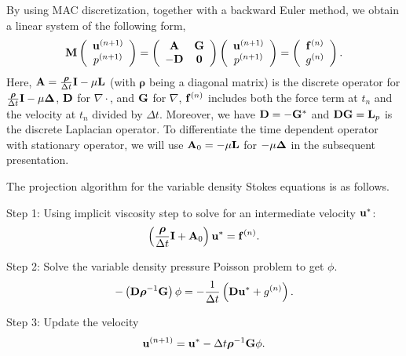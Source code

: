 \documentclass[9pt]{article}
\newcommand{\V}[1]{\boldsymbol{#1}}
\begin{document}
By using MAC discretization, together with a backward Euler method, we obtain a linear system of the following form,
\begin{equation}\label{Saddle_operator}
{\bf M} \left(\begin{array}{c}
{\bf u}^{(n+1)} \\
p^{(n+1)}
\end{array}\right)=
\left(\begin{array}{cc}
{\bf A} & {\bf G} \\
-{\bf D} & {\bf 0}
\end{array}\right)
\left(\begin{array}{c}
{\bf u}^{(n+1)} \\
p^{(n+1)}
\end{array}\right)=
\left(\begin{array}{c}
 {\bf f}^{(n)} \\
 g^{(n)}
\end{array}\right).
\end{equation}
Here, ${\bf A}=\frac{\V{\rho}}{\Delta t}{\bf I} - \mu {\bf L}$ (with ${\V{\rho}}$ being a diagonal matrix) is the discrete operator for $\frac{\V{\rho}}{\Delta t}{\bf I}-\mu  {\bf \Delta}$, ${\bf D}$ for $\nabla \cdot$, and ${\bf G}$ for $\nabla$, ${\bf f}^{(n)}$ includes both the force term at $t_n$ and the velocity at $t_n$ divided by $\Delta t$. Moreover, we have ${\bf D}=-{\bf G}^*$ and ${\bf D}{\bf G}={\bf L}_p$ is the discrete Laplacian operator. To differentiate the time dependent operator  with stationary operator, we will use ${\bf A}_0=-\mu  {\bf L}$ for $-\mu  {\bf \Delta}$ in the subsequent presentation.

The projection algorithm \cite{BellCollelaGlaz, Chorin} for the variable density Stokes equations is as follows.

Step 1: Using implicit viscosity step to solve for an intermediate velocity ${\bf u}^*$:
\begin{equation}\label{implicit_velocity}
\left( \frac{\V{\rho}}{\Delta t} {\bf I}+{\bf A}_0 \right){\bf u}^*= {\bf f}^{(n)}.
\end{equation}

Step 2: Solve the variable density pressure Poisson problem to get $\phi$.
\begin{equation}\label{pre_Poisson_eqn}
-\left({\bf D} \V{\rho}^{-1} {\bf G}\right) \phi =  -  \frac{1}{\Delta t}\left({\bf D} {\bf u}^*+g^{(n)}\right).
\end{equation}

Step 3: Update the velocity
$$
{\bf u}^{(n+1)}={\bf u}^* - \Delta t {\V{\rho}}^{-1} {\bf G} \phi.
$$
\end{document}
